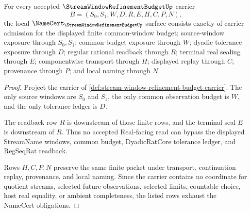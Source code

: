 \begin{theorem}
\label{thm:stream-window-refinement-budget-namecert-obligations}
For every accepted $\StreamWindowRefinementBudgetUp$ carrier
$$
B=(S_0,S_1,W,D,R,E,H,C,P,N),
$$
the local $\NameCert_{\StreamWindowRefinementBudgetUp}$ surface consists exactly of carrier admission for the displayed finite common-window budget; source-window exposure through $S_0,S_1$; common-budget exposure through $W$; dyadic tolerance exposure through $D$; regular rational readback through $R$; terminal real sealing through $E$; componentwise transport through $H$; displayed replay through $C$; provenance through $P$; and local naming through $N$.
\end{theorem}
\begin{proof}
Project the carrier of \autoref{def:stream-window-refinement-budget-carrier}. The only source windows are $S_0$ and $S_1$, the only common observation budget is $W$, and the only tolerance ledger is $D$.

The readback row $R$ is downstream of those finite rows, and the terminal seal $E$ is downstream of $R$. Thus no accepted Real-facing read can bypass the displayed StreamName windows, common budget, DyadicRatCore tolerance ledger, and RegSeqRat readback.

Rows $H,C,P,N$ preserve the same finite packet under transport, continuation replay, provenance, and local naming. Since the carrier contains no coordinate for quotient streams, selected future observations, selected limits, countable choice, host real equality, or ambient completeness, the listed rows exhaust the NameCert obligations.
\end{proof}

